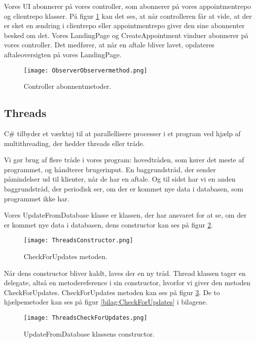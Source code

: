 Vores UI abonnerer på vores controller, som abonnerer på vores appointmentrepo og clientrepo klasser.
På figur \ref{fig:ObserverObservermethod} kan det ses, at når controlleren får at vide, at der er sket en ændring i clientrepo eller appointmentrepo giver den sine abonnenter besked om det.
Vores LandingPage og CreateAppointment vinduer abonnerer på vores controller.
Det medfører, at når en aftale bliver lavet, opdateres aftaleoversigten på vores LandingPage.

\begin{figure}[h]
    \caption{Controller abonnentmetoder.}
    \centering
        \texttt{[image: ObserverObservermethod.png]}
    \label{fig:ObserverObservermethod}
\end{figure}

\subsection{Threads}
\label{thread}
C\# tilbyder et værktøj til at parallellisere processer i et program ved hjælp af multithreading, der hedder threads eller tråde.

Vi gør brug af flere tråde i vores program: hovedtråden, som kører det meste af programmet, og håndterer brugerinput.
En baggrundstråd, der sender påmindelser ud til klienter, når de har en aftale.
Og til sidst har vi en anden baggrundstråd, der periodisk ser, om der er kommet nye data i databasen, som programmet ikke har.

Vores UpdateFromDatabase klasse er klassen, der har ansvaret for at se, om der er kommet nye data i databasen, dens constructor kan ses på figur \ref{fig:threadsConstructor}.

\begin{figure}[h]
    \caption{CheckForUpdates metoden.}
    \centering
        \texttt{[image: ThreadsConstructor.png]}
    \label{fig:threadsConstructor}
\end{figure}

Når dens constructor bliver kaldt, laves der en ny tråd.
Thread klassen tager en delegate, altså en metodereference i sin constructor, hvorfor vi giver den metoden CheckForUpdates.
CheckForUpdates metoden kan ses på figur \ref{fig:threadsUpdate}.
De to hjælpemetoder kan ses på figur \ref{bilag:CheckForUpdates} i bilagene.

\begin{figure}[H]
    \caption{UpdateFromDatabase klassens constructor.}
    \centering
        \texttt{[image: ThreadsCheckForUpdates.png]}
    \label{fig:threadsUpdate}
\end{figure}

